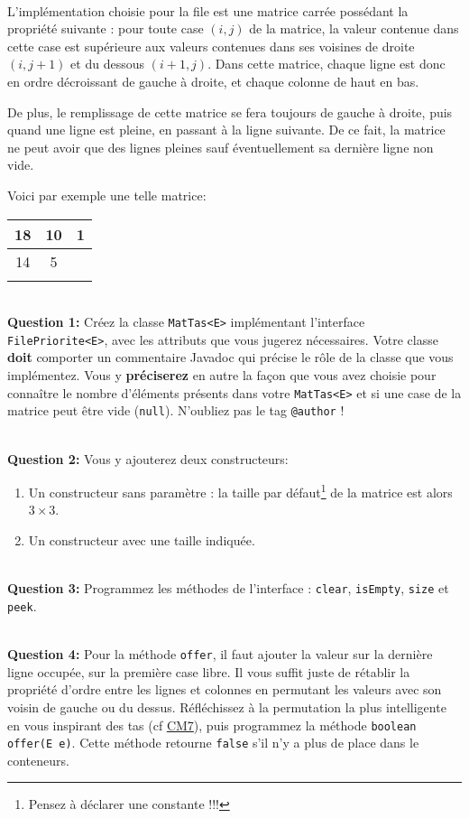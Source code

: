 \documentclass[iutinfo,10pt]{ustl-tdtp}
\begin{document}
~\\

L'implémentation choisie pour la file est une matrice carrée possédant la propriété suivante : pour toute case $(i,j)$ de la matrice, la valeur contenue dans cette case est supérieure aux valeurs contenues dans ses voisines de droite $(i,j+1)$ et du dessous $(i+1,j)$. Dans cette matrice, chaque ligne est donc en ordre décroissant de gauche à droite, et chaque colonne de haut en bas.

De plus, le remplissage de cette matrice se fera toujours de gauche à droite, puis quand une ligne est pleine, en passant à la ligne suivante. De ce fait, la matrice ne peut avoir que des lignes pleines sauf éventuellement sa dernière ligne non vide.

Voici par exemple une telle matrice:
\begin{tabular}{|c|c|c|}
\hline
18 & 10 & 1 \\
\hline
14 & 5 & \\
\hline
&&\\
\hline
\end{tabular}

~\\ \textbf{Question 1:} 
Créez la classe \texttt{MatTas<E>} implémentant l'interface \texttt{FilePriorite<E>}, avec les attributs que vous jugerez nécessaires. Votre classe \textbf{doit} comporter un commentaire Javadoc qui précise le rôle de la classe que vous implémentez. Vous y \textbf{préciserez} en autre la façon que vous avez choisie pour connaître le nombre d'éléments présents dans votre \texttt{MatTas<E>} et si une case de la matrice peut être vide (\texttt{null}). N'oubliez pas le tag \texttt{@author} !


~\\ \textbf{Question 2:} 
Vous y ajouterez deux constructeurs:
\begin{enumerate}
    \item Un constructeur sans paramètre : la taille par défaut\footnote{Pensez à déclarer une constante !!!} de la matrice est alors $3 \times 3$. 
    \item Un constructeur avec une taille indiquée.
\end{enumerate}


~\\ \textbf{Question 3:} 
Programmez les méthodes de l'interface : \texttt{clear}, \texttt{isEmpty}, \texttt{size} et \texttt{peek}. 

~\\ \textbf{Question 4:} 
Pour la méthode \texttt{offer}, il faut ajouter la valeur sur la dernière ligne occupée, sur la première case libre. Il vous suffit juste de rétablir la propriété d'ordre entre les lignes et colonnes en permutant les valeurs avec son voisin de gauche ou du dessus. Réfléchissez à la permutation la plus intelligente en vous inspirant des tas (cf \href{https://www.iut-info.univ-lille1.fr/~guyomarc/M3103_SDD/m3103_cm7_tas.pdf}{CM7}), puis programmez la méthode \texttt{boolean offer(E e)}. Cette méthode retourne \texttt{false} s'il n'y a plus de place dans le conteneurs.
\end{document}
